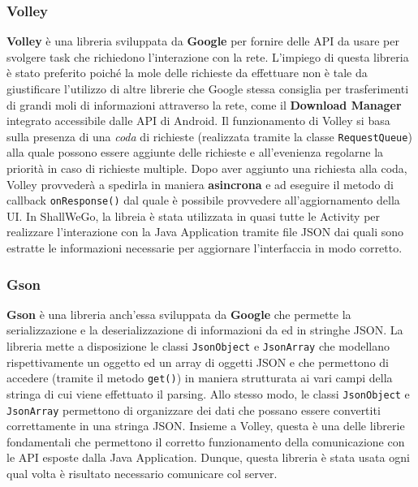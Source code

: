                 \subsubsection{Volley}
                    \textbf{Volley} è una libreria sviluppata da \textbf{Google} per fornire delle API da usare per svolgere task che richiedono l'interazione con la rete. L'impiego di questa libreria è stato preferito poiché la mole delle richieste da effettuare non è tale da giustificare l'utilizzo di altre librerie che Google stessa consiglia per trasferimenti di grandi moli di informazioni attraverso la rete, come il \textbf{Download Manager} integrato accessibile dalle API di Android. Il funzionamento di Volley si basa sulla presenza di una \textit{coda} di richieste (realizzata tramite la classe \texttt{RequestQueue}) alla quale possono essere aggiunte delle richieste e all'evenienza regolarne la priorità in caso di richieste multiple.
                    Dopo aver aggiunto una richiesta alla coda, Volley provvederà a spedirla in maniera \textbf{asincrona} e ad eseguire il metodo di callback \texttt{onResponse()} dal quale è possibile provvedere all'aggiornamento della UI. In ShallWeGo, la libreia è stata utilizzata in quasi tutte le Activity per realizzare l'interazione con la Java Application tramite file JSON dai quali sono estratte le informazioni necessarie per aggiornare l'interfaccia in modo corretto.
                
                \subsubsection{Gson}
                    \textbf{Gson} è una libreria anch'essa sviluppata da \textbf{Google} che permette la serializzazione e la deserializzazione di informazioni da ed in stringhe JSON. La libreria mette a disposizione le classi \texttt{JsonObject} e \texttt{JsonArray} che modellano rispettivamente un oggetto ed un array di oggetti JSON e che permettono di accedere (tramite il metodo \texttt{get()}) in maniera strutturata ai vari campi della stringa di cui viene effettuato il parsing. Allo stesso modo, le classi \texttt{JsonObject} e \texttt{JsonArray} permettono di organizzare dei dati che possano essere convertiti correttamente in una stringa JSON. Insieme a Volley, questa è una delle librerie fondamentali che permettono il corretto funzionamento della comunicazione con le API esposte dalla Java Application. Dunque, questa libreria è stata usata ogni qual volta è risultato necessario comunicare col server.

